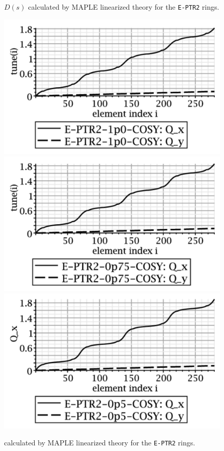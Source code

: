 \documentclass[]{article}
\begin{document}
\begin{figure}[htbp]
\begin{minipage}[b]{0.45\linewidth}
\caption{\label{fig:E-PTR2-MAPLE-dispersion}$D(s)$ calculated by MAPLE linearized  theory for 
the {\tt E-PTR2} rings.}
\end{minipage}
%
%
\begin{minipage}[b]{0.45\linewidth}
\centering
\includegraphics[scale=0.4]{pdf/E-PTR2-1p0-COSY-MAPLE-TuneAdvancex.pdf}
\includegraphics[scale=0.4]{pdf/E-PTR2-0p75-COSY-MAPLE-TuneAdvancex.pdf}
\includegraphics[scale=0.4]{pdf/E-PTR2-0p5-COSY-MAPLE-TuneAdvancex.pdf}
\caption{\label{fig:E-PTR2-MAPLE-TuneAdvance} calculated by MAPLE linearized  theory for 
the {\tt E-PTR2} rings.}
\end{minipage}
\end{figure}
%
\end{document}
